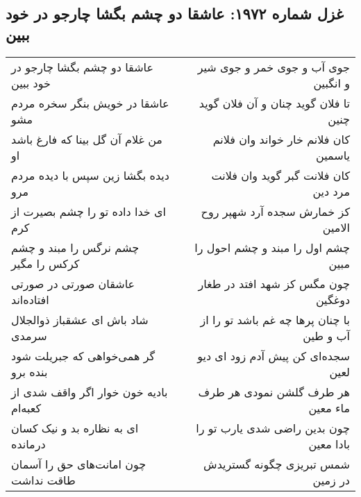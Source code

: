 \begin{center}
\section*{غزل شماره ۱۹۷۲: عاشقا دو چشم بگشا چارجو در خود ببین}
\label{sec:1972}
\begin{longtable}{l p{0.5cm} r}
عاشقا دو چشم بگشا چارجو در خود ببین
&&
جوی آب و جوی خمر و جوی شیر و انگبین
\\
عاشقا در خویش بنگر سخره مردم مشو
&&
تا فلان گوید چنان و آن فلان گوید چنین
\\
من غلام آن گل بینا که فارغ باشد او
&&
کان فلانم خار خواند وان فلانم یاسمین
\\
دیده بگشا زین سپس با دیده مردم مرو
&&
کان فلانت گبر گوید وان فلانت مرد دین
\\
ای خدا داده تو را چشم بصیرت از کرم
&&
کز خمارش سجده آرد شهپر روح الامین
\\
چشم نرگس را مبند و چشم کرکس را مگیر
&&
چشم اول را مبند و چشم احول را مبین
\\
عاشقان صورتی در صورتی افتاده‌اند
&&
چون مگس کز شهد افتد در طغار دوغگین
\\
شاد باش ای عشقباز ذوالجلال سرمدی
&&
با چنان پرها چه غم باشد تو را از آب و طین
\\
گر همی‌خواهی که جبریلت شود بنده برو
&&
سجده‌ای کن پیش آدم زود ای دیو لعین
\\
بادیه خون خوار اگر واقف شدی از کعبه‌ام
&&
هر طرف گلشن نمودی هر طرف ماء معین
\\
ای به نظاره بد و نیک کسان درمانده
&&
چون بدین راضی شدی یارب تو را بادا معین
\\
چون امانت‌های حق را آسمان طاقت نداشت
&&
شمس تبریزی چگونه گستریدش در زمین
\\
\end{longtable}
\end{center}
